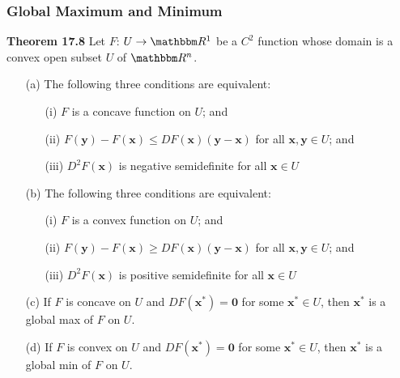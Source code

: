 \documentclass[9pt,aspectratio=169]{beamer}
\newcommand{\RR}{\mathbbm R}
\begin{document}
\begin{frame}
	\frametitle{Global Maximum and Minimum}
	\begin{block}{\textbf{Theorem 17.8}}
		Let $F$: $U \rightarrow \RR^1$ be a $C^2$ function whose domain is a convex open subset $U$ of $\RR^n$. 
		\begin{enumerate}
			\item[(a)] The following three conditions are equivalent: 
			\begin{enumerate}
				\item[(i)] $F$ is a concave function on $U$; and 
				\item[(ii)] $F(\mathbf{y}) - F(\mathbf{x})\leq
                DF(\mathbf{x})(\mathbf{y}-\mathbf{x})$ for all
                $\mathbf{x,y}\in U$; and
				\item[(iii)] $D^2F(\mathbf{x})$ is negative semidefinite
                for all $\mathbf{x}\in U$
			\end{enumerate}
			\item[(b)] The following three conditions are equivalent:
			\begin{enumerate}
				\item[(i)] $F$ is a convex function on $U$; and
				\item[(ii)] $F(\mathbf{y}) - F(\mathbf{x})\geq
                DF(\mathbf{x})(\mathbf{y}-\mathbf{x})$ for all
                $\mathbf{x,y}\in U$; and
				\item[(iii)] $D^2F(\mathbf{x})$ is positive semidefinite
                for all $\mathbf{x}\in U$
			\end{enumerate}
            \item[(c)] If $F$ is concave on $U$ and
            $DF(\mathbf{x^*}) = \mathbf{0}$ for some $\mathbf{x^*}\in U$,
            then $\mathbf{x^*}$ is a global max of $F$ on $U$.
            \item[(d)] If $F$ is convex on $U$ and $DF(\mathbf{x^*}) =
            \mathbf{0}$ for some $\mathbf{x^*}\in U$, then $\mathbf{x^*}$ is
            a global min of $F$ on $U$.
		\end{enumerate}	
	\end{block}
\end{frame}		
		
\end{document}
